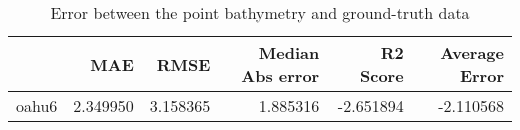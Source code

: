 \begin{table}[h!]
\caption{Error between the point bathymetry and ground-truth data}
\label{tab:oahu6_lidar_error}
\begin{tabular}{lrrrrr}
\toprule
 & MAE & RMSE & Median Abs error & R2 Score & Average Error \\
\midrule
oahu6 & 2.349950 & 3.158365 & 1.885316 & -2.651894 & -2.110568 \\
\bottomrule
\end{tabular}
\end{table}
